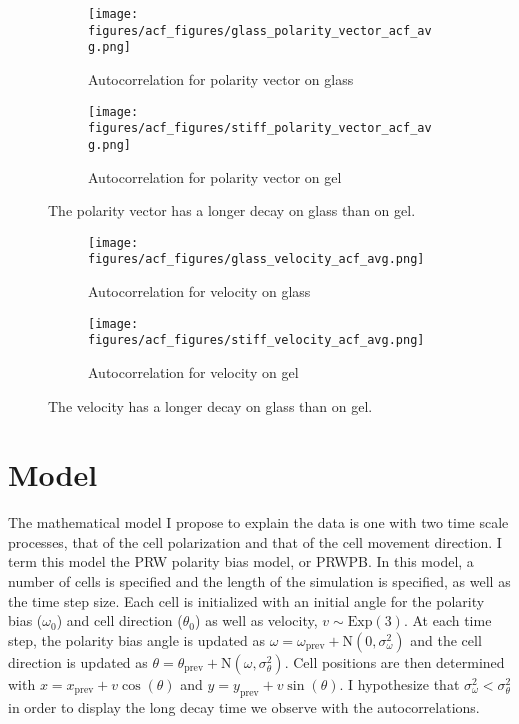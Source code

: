\documentclass[12pt]{article}
\begin{document}
\begin{figure}[h!]
    \centering
    \begin{subfigure}[b]{0.4\linewidth}
      \texttt{[image: figures/acf\_figures/glass\_polarity\_vector\_acf\_avg.png]}
      \caption{Autocorrelation for polarity vector on glass}
    \end{subfigure}
    \begin{subfigure}[b]{0.4\linewidth}
      \texttt{[image: figures/acf\_figures/stiff\_polarity\_vector\_acf\_avg.png]}
      \caption{Autocorrelation for polarity vector on gel}
    \end{subfigure}
    \caption{The polarity vector has a longer decay on glass than on gel.}
  \end{figure}

\begin{figure}[h!]
    \centering
    \begin{subfigure}[b]{0.4\linewidth}
      \texttt{[image: figures/acf\_figures/glass\_velocity\_acf\_avg.png]}
      \caption{Autocorrelation for velocity on glass}
    \end{subfigure}
    \begin{subfigure}[b]{0.4\linewidth}
      \texttt{[image: figures/acf\_figures/stiff\_velocity\_acf\_avg.png]}
      \caption{Autocorrelation for velocity on gel}
    \end{subfigure}
    \caption{The velocity has a longer decay on glass than on gel.}
  \end{figure}

\section{Model}
The mathematical model I propose to explain the data is one with two time scale processes, that of the cell polarization and that of the cell
movement direction. I term this model the PRW polarity bias model, or PRWPB. In this model, a number of cells is specified and the length of the simulation is specified, as well as the time step size.
Each cell is initialized with an initial angle for the polarity bias ($\omega_{0}$) and cell direction ($\theta_{0}$) as well as velocity, $v \sim \text{Exp}(3)$. At each time step, the polarity bias
angle is updated as $\omega = \omega_{\text{prev}} + \text{N}(0,\sigma^{2}_{\omega})$ and the cell direction is updated as $\theta = \theta_{\text{prev}} + \text{N}(\omega,\sigma^{2}_{\theta})$.
Cell positions are then determined with $x = x_{\text{prev}} + v \cos(\theta)$ and $y = y_{\text{prev}} + v \sin(\theta)$. I hypothesize that $\sigma_{\omega}^{2} < \sigma_{\theta}^{2}$ in order to 
display the long decay time we observe with the autocorrelations. 
\end{document}
